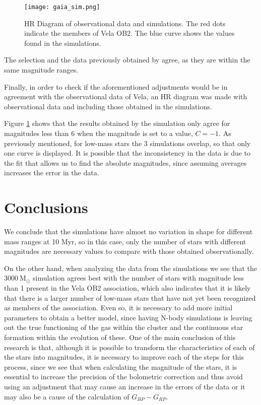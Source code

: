 \documentclass[baaa]{baaa}
\begin{document}
\begin{figure}[!t]
\centering
\texttt{[image: gaia\_sim.png]}
\caption{HR Diagram of observational data and simulations. The red dots indicate the members of Vela OB2. The blue curve shows the values found in the simulations.}
\label{Figura4}
\end{figure}

{The selection and the data previously obtained by \cite{cantat} agree, as they are within the same magnitude ranges.}

Finally, in order to check if the aforementioned adjustments would be in agreement with the observational data of Vela, an HR diagram was made with observational data and including those obtained in the simulations. 

Figure \ref{Figura4} shows that the results obtained by the simulation only agree for magnitudes less than 6 when the magnitude is set to a value, $C = -1$.
As previously mentioned, for low-mass stars the 3 simulations overlap, so that only one curve is displayed. 
It is possible that the inconsistency in the data is due to the fit that allows us to find the absolute magnitudes, since assuming averages increases the error in the data.

\section{Conclusions}
We conclude that the simulations have almost no variation in shape for different mass ranges at 10 Myr, so in this case, only the number of stars with different magnitudes are necessary values to compare with those obtained observationally.

On the other hand, when analyzing the data from the simulations we see that the $3000~\mathrm{M_{\odot}}$ simulation agrees best with the number of stars with magnitude less than 1 present in the Vela OB2 association, which also indicates that it is likely that there is a larger number of low-mass stars that have not yet been recognized as members of the association.
Even so, it is necessary to add more initial parameters to obtain a better model, since having N-body simulations is leaving out the true functioning of the gas within the cluster and the continuous star formation within the evolution of these.
One of the main conclusion of this research is that, although it is possible to transform the characteristics of each of the stars into magnitudes, it is necessary to improve each of the steps for this process, since we see that when calculating the magnitude of the stars, it is essential to increase the precision of the  bolometric correction and thus avoid using an adjustment that may cause an increase in the errors of the data or it may also be a cause of the calculation of $G_{BP}-G_{RP}$.
\end{document}
